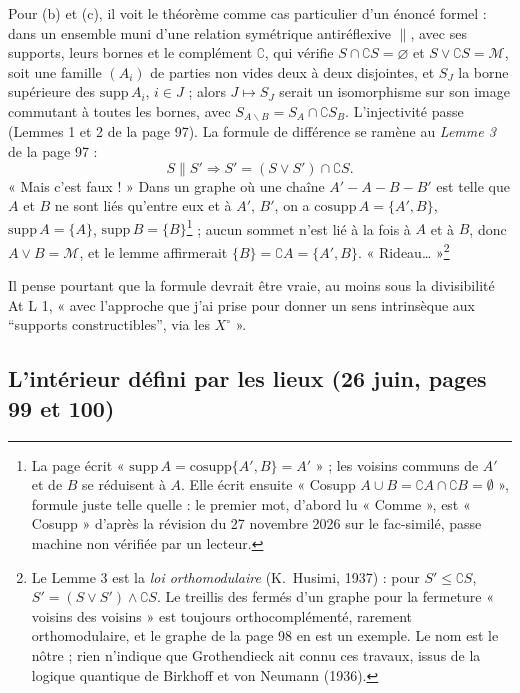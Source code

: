 \documentclass[11pt,a4paper]{article}
\begin{document}
Pour (b) et (c), il voit le théorème comme cas particulier d'un énoncé formel :
dans un ensemble muni d'une relation symétrique antiréflexive $\parallel$, avec
ses supports, leurs bornes et le complément $\complement$, qui vérifie $S \cap
\complement S = \varnothing$ et $S \vee \complement S = \mathcal{M}$, soit une
famille $(A_{i})$ de parties non vides deux à deux disjointes, et $S_{J}$ la borne
supérieure des $\mathrm{supp}\, A_{i}$, $i \in J$ ; alors $J \mapsto S_{J}$ serait
un isomorphisme sur son image commutant à toutes les bornes, avec $S_{A
\smallsetminus B} = S_{A} \cap \complement S_{B}$. L'injectivité passe (Lemmes 1 et 2
de la page 97). La formule de différence se ramène au \emph{Lemme 3} de la page 97 :
\[
S \parallel S' \Longrightarrow S' = (S \vee S') \cap \complement S .
\]
« Mais c'est faux ! » Dans un graphe où une chaîne $A' - A - B - B'$ est telle que
$A$ et $B$ ne sont liés qu'entre eux et à $A'$, $B'$, on a $\mathrm{cosupp}\, A =
\{A', B\}$, $\mathrm{supp}\, A = \{A\}$, $\mathrm{supp}\, B = \{B\}$\footnote{La page
écrit « $\mathrm{supp}\, A = \mathrm{cosupp}\{A', B\} = A'$ » ; les voisins communs
de $A'$ et de $B$ se réduisent à $A$. Elle écrit ensuite « Cosupp $A \cup B =
\complement A \cap \complement B = \emptyset$ », formule juste telle quelle : le
premier mot, d'abord lu « Comme », est « Cosupp » d'après la révision du 27
novembre 2026 sur le fac-similé, passe machine non vérifiée par un lecteur.} ; aucun sommet n'est lié à la
fois à $A$ et à $B$, donc $A \vee B = \mathcal{M}$, et le lemme affirmerait
$\{B\} = \complement A = \{A', B\}$. « Rideau… »\footnote{Le Lemme 3 est la
\emph{loi orthomodulaire} (K.~Husimi, 1937) : pour $S' \leq \complement S$, $S' =
(S \vee S') \wedge \complement S$. Le treillis des fermés d'un graphe pour la
fermeture « voisins des voisins » est toujours orthocomplémenté, rarement
orthomodulaire, et le graphe de la page 98 en est un exemple. Le nom est le nôtre ;
rien n'indique que Grothendieck ait connu ces travaux, issus de la logique
quantique de Birkhoff et von Neumann (1936).}

Il pense pourtant que la formule devrait être vraie, au moins sous la
divisibilité At L 1, « avec l'approche que j'ai prise pour donner un sens
intrinsèque aux “supports constructibles”, via les $X^{\circ}$ ».

\subsection*{L'intérieur défini par les lieux (26 juin, pages 99 et 100)}
\end{document}

